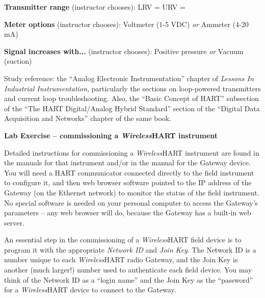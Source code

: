 \vskip 10pt

\noindent
{\bf Transmitter range} (instructor chooses): \hskip 20pt LRV = \underbar{\hskip 50pt} \hskip 20pt URV = \underbar{\hskip 50pt}

\vskip 10pt

\noindent
{\bf Meter options} (instructor chooses): \hskip 20pt \underbar{\hskip 20pt} Voltmeter (1-5 VDC) \hskip 10pt {\it or} \hskip 10pt \underbar{\hskip 20pt} Ammeter (4-20 mA)

\vskip 10pt

\noindent
{\bf Signal increases with...} (instructor chooses): \hskip 20pt \underbar{\hskip 20pt} Positive pressure \hskip 10pt {\it or} \hskip 10pt \underbar{\hskip 20pt} Vacuum (suction)

\vskip 10pt

\vfil

Study reference: the ``Analog Electronic Instrumentation'' chapter of {\it Lessons In Industrial Instrumentation}, particularly the sections on loop-powered transmitters and current loop troubleshooting.  Also, the ``Basic Concept of HART'' subsection of the ``The HART Digital/Analog Hybrid Standard'' section of the ``Digital Data Acquisition and Networks'' chapter of the same book.








\vfil \eject

\noindent
{\bf Lab Exercise -- commissioning a {\sl Wireless}HART instrument}

\vskip 5pt

Detailed instructions for commissioning a {\sl Wireless}HART instrument are found in the manuals for that instrument and/or in the manual for the Gateway device.  You will need a HART communicator connected directly to the field instrument to configure it, and then web browser software pointed to the IP address of the Gateway (on the Ethernet network) to monitor the status of the field instrument.  No special software is needed on your personal computer to access the Gateway's parameters -- any web browser will do, because the Gateway has a built-in web server.

An essential step in the commissioning of a {\sl Wireless}HART field device is to program it with the appropriate {\it Network ID} and {\it Join Key}.  The Network ID is a number unique to each {\it Wireless}HART radio Gateway, and the Join Key is another (much larger!) number used to authenticate each field device.  You may think of the Network ID as a ``login name'' and the Join Key as the ``password'' for a {\sl Wireless}HART device to connect to the Gateway.  


